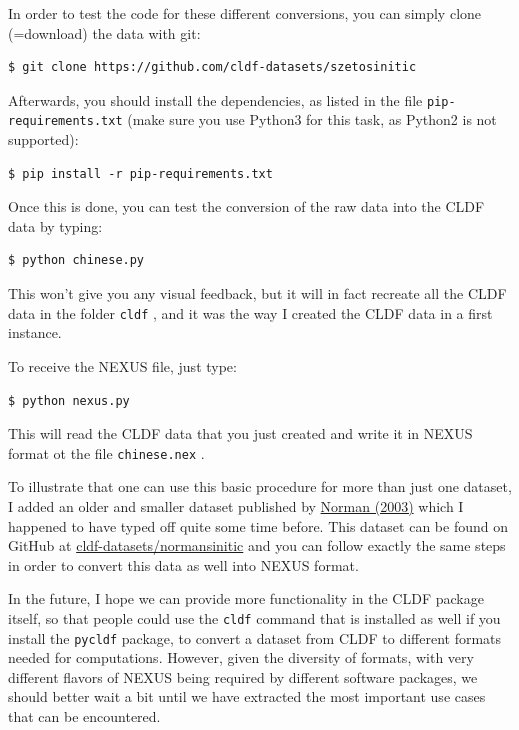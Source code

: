 \documentclass[
  english,
  a4paper,
  oneside,tablecaptionabove
]{scrbook}
\newcommand{\passthrough}[1]{#1}
\begin{document}
In order to test the code for these different conversions, you can
simply clone (=download) the data with git:

\begin{lstlisting}
$ git clone https://github.com/cldf-datasets/szetosinitic
\end{lstlisting}

Afterwards, you should install the dependencies, as listed in the file
\passthrough{\lstinline!pip-requirements.txt!} (make sure you use
Python3 for this task, as Python2 is not supported):

\begin{lstlisting}
$ pip install -r pip-requirements.txt
\end{lstlisting}

Once this is done, you can test the conversion of the raw data into the
CLDF data by typing:

\begin{lstlisting}
$ python chinese.py
\end{lstlisting}

This won't give you any visual feedback, but it will in fact recreate
all the CLDF data in the folder \passthrough{\lstinline!cldf!} , and it
was the way I created the CLDF data in a first instance.

To receive the NEXUS file, just type:

\begin{lstlisting}
$ python nexus.py
\end{lstlisting}

This will read the CLDF data that you just created and write it in NEXUS
format ot the file \passthrough{\lstinline!chinese.nex!} .

To illustrate that one can use this basic procedure for more than just
one dataset, I added an older and smaller dataset published by
\href{http://bibliography.lingpy.org?key=Normal2003}{Norman (2003)}
which I happened to have typed off quite some time before. This dataset
can be found on GitHub at
\href{https://github.com/cldf-datasets/normansinitic}{cldf-datasets/normansinitic}
and you can follow exactly the same steps in order to convert this data
as well into NEXUS format.

In the future, I hope we can provide more functionality in the CLDF
package itself, so that people could use the
\passthrough{\lstinline!cldf!} command that is installed as well if you
install the \passthrough{\lstinline!pycldf!} package, to convert a
dataset from CLDF to different formats needed for computations. However,
given the diversity of formats, with very different flavors of NEXUS
being required by different software packages, we should better wait a
bit until we have extracted the most important use cases that can be
encountered.
\end{document}

